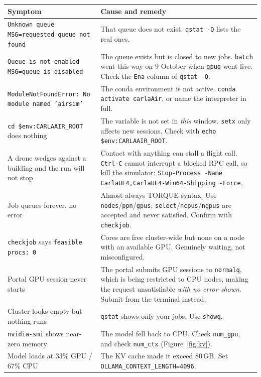 \documentclass[11pt,a4paper]{article}
\begin{document}
\begin{center}
\begin{tabularx}{\linewidth}{@{}>{\raggedright\arraybackslash}p{4.6cm} X@{}}
\toprule
\textbf{Symptom} & \textbf{Cause and remedy} \\
\midrule
\texttt{Unknown queue MSG=requested queue not found} & That queue does not exist.
\texttt{qstat -Q} lists the real ones. \\
\texttt{Queue is not enabled MSG=queue is disabled} & The queue exists but is
closed to new jobs. \texttt{batch} went this way on 9 October when \texttt{gpuq}
went live. Check the \texttt{Ena} column of \texttt{qstat -Q}. \\
\texttt{ModuleNotFoundError: No module named 'airsim'} & The conda environment is
not active. \texttt{conda activate carlaAir}, or name the interpreter in full. \\
\texttt{cd \$env:CARLAAIR\_ROOT} does nothing & The variable is not set in
\emph{this} window. \texttt{setx} only affects new sessions. Check with
\texttt{echo \$env:CARLAAIR\_ROOT}. \\
A drone wedges against a building and the run will not stop & Contact with
anything can stall a flight call. \texttt{Ctrl-C} cannot interrupt a blocked RPC
call, so kill the simulator: \texttt{Stop-Process -Name
CarlaUE4,CarlaUE4-Win64-Shipping -Force}. \\
Job queues forever, no error & Almost always TORQUE syntax. Use
\texttt{nodes}/\texttt{ppn}/\texttt{gpus}; \texttt{select}/\texttt{ncpus}/\texttt{ngpus}
are accepted and never satisfied. Confirm with \texttt{checkjob}. \\
\texttt{checkjob} says \texttt{feasible procs: 0} & Cores are free cluster-wide
but none on a node with an available GPU. Genuinely waiting, not misconfigured. \\
Portal GPU session never starts & The portal submits GPU sessions to
\texttt{normalq}, which is being restricted to CPU nodes, making the request
unsatisfiable \emph{with no error shown}. Submit from the terminal instead. \\
Cluster looks empty but nothing runs & \texttt{qstat} shows only your jobs. Use
\texttt{showq}. \\
\texttt{nvidia-smi} shows near-zero memory & The model fell back to CPU. Check
\texttt{num\_gpu}, and check \texttt{num\_ctx} (Figure~\ref{fig:kv}). \\
Model loads at 33\% GPU / 67\% CPU & The KV cache made it exceed 80\,GB. Set
\texttt{OLLAMA\_CONTEXT\_LENGTH=4096}. \\

\end{tabularx}
\end{center}
\end{document}
